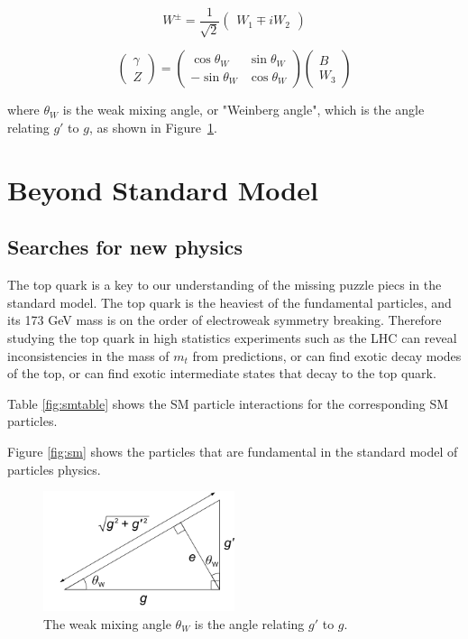 \begin{equation}
	W^{\pm} = \frac{1}{\sqrt{2}}
	\begin{pmatrix}
		W_1 \mp iW_2
	\end{pmatrix}
	\label{eq:w}
\end{equation}


\begin{equation}
	\begin{pmatrix}
		\gamma \\
		Z 
	\end{pmatrix} = \begin{pmatrix}
		\cos{\theta_W} & \sin{\theta_W} \\
		-\sin{\theta_W} & \cos{\theta_W}
	\end{pmatrix}
	\begin{pmatrix}
		B \\
		W_3 
	\end{pmatrix}
	\label{eq:zgamma}
\end{equation}

where $\theta_W$ is the weak mixing angle, or "Weinberg angle", which is the angle relating $g'$ to $g$, as shown in Figure~\ref{fig:weinberg}.


\section{Beyond Standard Model}


\subsection{Searches for new physics}

The top quark is a key to our understanding of the missing puzzle piecs in the standard model. The top quark is the heaviest of the fundamental particles, and its 173 GeV mass is on the order of electroweak symmetry breaking. Therefore studying the top quark in high statistics experiments such as the LHC can reveal inconsistencies in the mass of $m_t$ from predictions, or can find exotic decay modes of the top, or can find exotic intermediate states that decay to the top quark.



Table \ref{fig:smtable} shows the SM particle interactions for the corresponding SM particles.

Figure \ref{fig:sm} shows the particles that are fundamental in the standard model of particles physics.

\begin{figure}[htbp!]
	\centering
	\includegraphics[width=0.5\textwidth]{figures/Weinberg_angle.png}
	\caption{The weak mixing angle $\theta_W$ is the angle relating $g'$ to $g$.}
	\label{fig:weinberg}
\end{figure}

